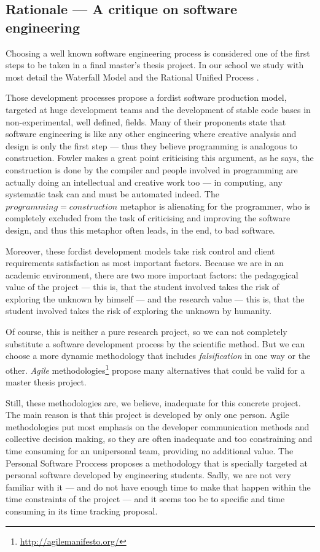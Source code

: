 \subsection{Rationale --- A critique on software engineering}

Choosing a well known software engineering
process is considered one of the first steps to be taken in a final
master's thesis project. In our school we study with most detail the
Waterfall Model \cite{benington87production}
and the Rational Unified Process
\cite{kruchten03rup}.

Those development processes propose a fordist software production
model, targeted at huge development teams and the development of
stable code bases in non-experimental, well defined, fields. Many of
their proponents state that software engineering is like any other
engineering where creative analysis and design is only the first step
--- thus they believe programming is analogous to construction.
Fowler makes a great point \cite{fowler01design} criticising this
argument, as he says, the construction is done by the compiler and
people involved in programming are actually doing an intellectual and
creative work too --- in computing, any systematic task can and must
be automated indeed. The $programming=construction$ metaphor is
alienating for the programmer, who is completely excluded from the
task of criticising and improving the software design, and thus this
metaphor often leads, in the end, to bad software.

Moreover, these fordist development models take risk control and
client requirements satisfaction as most important factors. Because we
are in an academic environment, there are two more important factors:
the pedagogical value of the project --- this is, that the student
involved takes the risk of exploring the unknown by himself --- and
the research value --- this is, that the student involved takes the
risk of exploring the unknown by humanity.

Of course, this is neither a pure research project, so we can not
completely substitute a software development process by the scientific
method. But we can choose a more dynamic methodology that includes
\emph{falsification} in one way or the other. \emph{Agile}
methodologies\footnote{\url{http://agilemanifesto.org/}} propose many
alternatives that could be valid for a master thesis project.

Still, these methodologies are, we believe, inadequate for this
concrete project. The main reason is that this project is developed by
only one person. Agile methodologies put most emphasis on the
developer communication methods and collective decision making, so
they are often inadequate and too constraining and time consuming for
an unipersonal team, providing no additional value.  The Personal
Software Proccess \cite{watts96psp} proposes a methodology that is
specially targeted at personal software developed by engineering
students. Sadly, we are not very familiar with it --- and do not have
enough time to make that happen within the time constraints of the
project --- and it seems too be to specific and time consuming in its
time tracking proposal.


